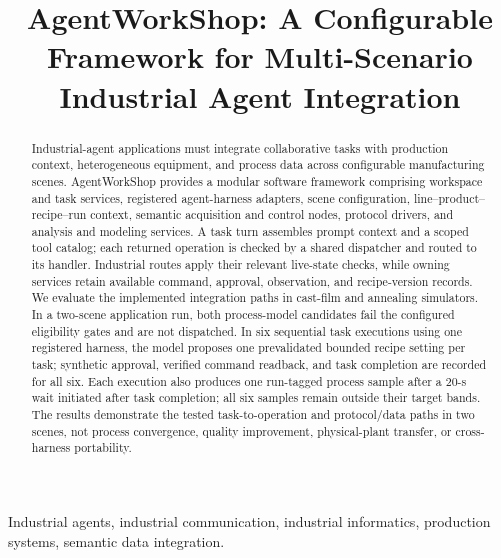 \documentclass[journal]{IEEEtran}
\begin{document}

\title{AgentWorkShop: A Configurable Framework for Multi-Scenario Industrial Agent Integration}

\author{}

\maketitle

\begin{abstract}
Industrial-agent applications must integrate collaborative tasks with
production context, heterogeneous equipment, and process data across
configurable manufacturing scenes. AgentWorkShop provides a modular software
framework comprising workspace and task services, registered agent-harness
adapters, scene configuration, line--product--recipe--run context, semantic
acquisition and control nodes, protocol drivers, and analysis and modeling
services. A task turn assembles prompt context and a scoped tool catalog;
each returned operation is checked by a shared dispatcher and routed to its
handler. Industrial routes apply their relevant live-state checks, while
owning services retain available command, approval, observation, and
recipe-version records. We
evaluate the implemented integration paths in cast-film and annealing
simulators. In a two-scene application run, both process-model candidates fail
the configured eligibility gates and are not dispatched. In six sequential
task executions using one registered harness, the model proposes one
prevalidated bounded recipe setting per task; synthetic approval, verified
command readback, and task completion are recorded for all six. Each execution
also produces one run-tagged process sample after a 20-s wait initiated after
task completion; all six samples remain outside their target bands. The
results demonstrate the tested task-to-operation and protocol/data paths in
two scenes, not process convergence, quality improvement, physical-plant
transfer, or cross-harness portability.
\end{abstract}

\begin{IEEEkeywords}
Industrial agents, industrial communication, industrial informatics,
production systems, semantic data integration.
\end{IEEEkeywords}

\IEEEpeerreviewmaketitle
\end{document}
